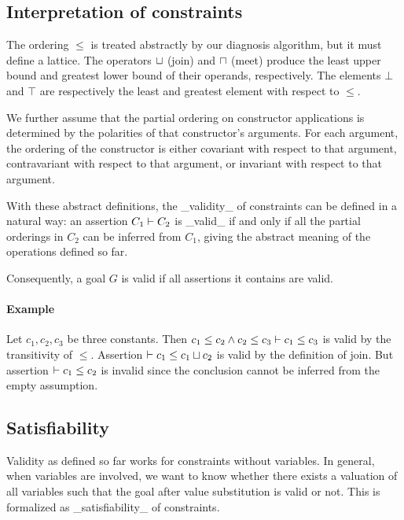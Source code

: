 \subsection{Interpretation of constraints}

The ordering $\leq$ is treated abstractly by our diagnosis algorithm,
but it must define a lattice. The operators $\sqcup$ (join) and $\sqcap$
(meet) produce the least upper bound and greatest lower bound
of their operands, respectively.
%
The elements $\bot$ and $\top$ are respectively the least and greatest
element with respect to $\leq$.

We further assume that the partial ordering on constructor applications
is determined by the polarities of that constructor's arguments.
For each argument, the ordering of the constructor is either
covariant with respect to that argument, contravariant with respect
to that argument, or invariant with respect to that argument.

With these abstract definitions, the _validity_ of constraints can be defined
in a natural way: an assertion $C_1 \vdash C_2$ is _valid_ if and only if all
the partial orderings in $C_2$ can be inferred from $C_1$, giving the abstract
meaning of the operations defined so far.

Consequently, a goal $G$ is valid if all assertions it contains are valid.

\paragraph{Example}

Let $c_1, c_2, c_3$ be three constants. Then $c_1 \leq c_2 \land c_2 \leq c_3
\vdash c_1 \leq c_3$ is valid by the transitivity of $\leq$. Assertion $
\vdash c_1 \leq c_1 \sqcup c_2$ is valid by the definition of join. But
assertion $\vdash c_1\leq c_2$ is invalid since the
conclusion cannot be inferred from the empty assumption.

\subsection{Satisfiability}

Validity as defined so far works for constraints without variables. In
general, when variables are involved, we want to know whether there
exists a valuation of all variables such that the goal after value
substitution is valid or not. This is formalized as _satisfiability_
of constraints.

